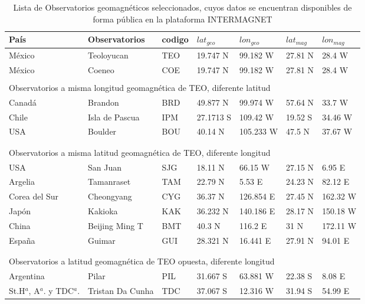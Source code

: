 \documentclass[preprint,12pt]{article}
\begin{document}
\begin{table}[htbp]
		\normalsize
	\centering
	\caption{Lista de Observatorios geomagnéticos seleccionados, cuyos datos se encuentran disponibles de forma pública en la plataforma INTERMAGNET}
	\begin{tabular}{lllllll}
		\hline
		País & Observatorios & codigo & $lat_{geo}$ & $lon_{geo}$ & $lat_{mag}$ &  $lon_{mag}$\\ \hline
		México & Teoloyucan & TEO & 19.747 N & 99.182 W & 27.81 N & 28.4 W \\
		México & Coeneo & COE & 19.747 N & 99.182 W & 27.81 N & 28.4 W \\
		&  &  &  &  &  &  \\ 
		\multicolumn{7}{l}{Observatorios a misma longitud geomagnética de TEO, diferente latitud} \\  \hline
		Canadá & Brandon & BRD & 49.877 N & 99.974 W & 57.64 N & 33.7 W \\ 
		Chile & Isla de Pascua & IPM & 27.1713 S & 109.42 W & 19.52 S & 34.46 W \\ 
		USA & Boulder & BOU & 40.14 N & 105.233 W & 47.5 N & 37.67 W \\ 
		&  &  &  &  &  &  \\
		&  &  &  &  &  &  \\ 
		\multicolumn{7}{l}{Observatorios a misma latitud geomagnética de TEO, diferente longitud} \\ \hline
		USA & San Juan & SJG & 18.11 N & 66.15 W & 27.15 N & 6.95 E \\ 
		Argelia & Tamanraset & TAM & 22.79 N & 5.53 E & 24.23 N & 82.12 E \\ 
		Corea del Sur & Cheongyang & CYG & 36.37 N & 126.854 E & 27.45 N & 162.32 W \\
		Japón & Kakioka & KAK & 36.232 N & 140.186 E & 28.17 N & 150.18 W \\ 
		China & Beijing Ming T & BMT & 40.3 N & 116.2 E & 31 N & 172.11 W \\ 
		España & Guimar & GUI & 28.321 N & 16.441 E & 27.91 N & 94.01 E \\ 
		&  &  &  &  &  &  \\ 
		&  &  &  &  &  &  \\ 
		\multicolumn{7}{l}{Observatorios a latitud geomagnética de TEO opuesta, diferente longitud} \\ \hline
		Argentina & Pilar & PIL & 31.667 S & 63.881 W & 22.38 S & 8.08 E \\ 
		St.H$^a$, A$^a$. y TDC$^a$. & Tristan Da Cunha & TDC & 37.067 S & 12.316 W & 31.94 S & 54.99 E \\ 

\end{tabular}
\end{table}
\end{document}
